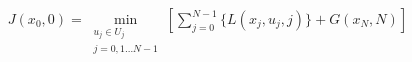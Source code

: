 \documentclass[varwidth]{standalone}
\begin{document}
    \begin{gather}
        J(x_0, 0) = \min_{
            \substack{
                u_j \in U_j \\
                j = 0, 1 \dots N-1 \\
                }
            }
            \left[ \sum_{j=0}^{N-1} \{L(x_j, u_j, j)\} + G(x_N, N)\right]
    \end{gather}
\end{document}

